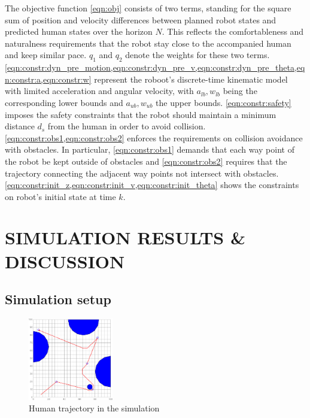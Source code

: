 \documentclass[letterpaper, 10 pt, conference]{ieeeconf}
\begin{document}
The objective function \cref{eqn:obj} consists of two terms, standing for the square sum of position and velocity differences between planned robot states and predicted human states over the horizon $N$.
This reflects the comfortableness and naturalness requirements that the robot stay close to the accompanied human and keep similar pace.
$q_1$ and $q_2$ denote the weights for these two terms.
\cref{eqn:constr:dyn_pre_motion,eqn:constr:dyn_pre_v,eqn:constr:dyn_pre_theta,eqn:constr:a,eqn:constr:w} represent the roboot's discrete-time kinematic model with limited acceleration and angular velocity, with $a_{lb},w_{lb}$ being the corresponding lower bounds and $a_{ub},w_{ub}$ the upper bounds.
\cref{eqn:constr:safety} imposes the safety constraints that the robot should maintain a minimum distance $d_s$ from the human in order to avoid collision.
\cref{eqn:constr:obs1,eqn:constr:obs2} enforces the requirements on collision avoidance with obstacles.
In particular, \cref{eqn:constr:obs1} demands that each way point of the robot be kept outside of obstacles and \cref{eqn:constr:obs2} requires that the trajectory connecting the adjacent way points not intersect with obstacles.
 \cref{eqn:constr:init_z,eqn:constr:init_v,eqn:constr:init_theta} shows the constraints on robot's initial state at time $k$.


\section{SIMULATION RESULTS \& DISCUSSION}\label{sec:results}
\subsection{Simulation setup}
\begin{figure}
\centering
\includegraphics[width=0.33\textwidth]{figures/full_sim_traj}
\caption{Human trajectory in the simulation}
\label{fig:sim_traj}
\end{figure}
\end{document}
